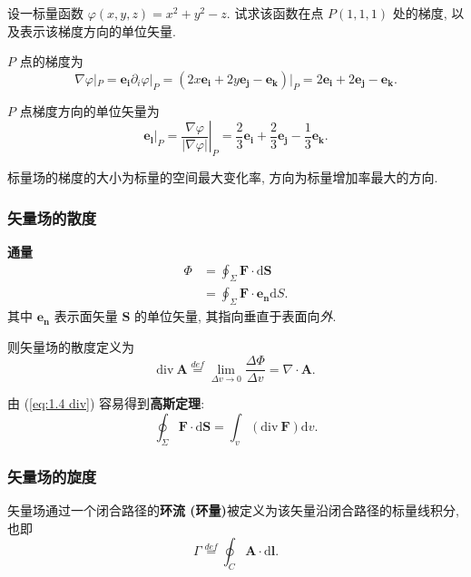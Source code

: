 \begin{exampleprob}
    设一标量函数 $\varphi(x,y,z)=x^2+y^2-z$. 试求该函数在点 $P(1,1,1)$ 处的梯度, 以及表示该梯度方向的单位矢量.

    \begin{solution}
        $P$ 点的梯度为
        \begin{equation*}
            \nabla\varphi|_P=\bm{e_i}\partial_i\varphi|_P=(2x\bm{e_i}+2y\bm{e_j}-\bm{e_k})|_P=2\bm{e_i}+2\bm{e_j}-\bm{e_k}.
        \end{equation*}

        $P$ 点梯度方向的单位矢量为
        \begin{equation*}
            \bm{e_l}|_P=\left.\frac{\nabla\varphi}{|\nabla\varphi|}\right|_P=\frac{2}{3}\bm{e_i}+\frac{2}{3}\bm{e_j}-\frac{1}{3}\bm{e_k}.
        \end{equation*}
    \end{solution}
\end{exampleprob}

标量场的梯度的大小为标量的空间最大变化率, 方向为标量增加率最大的方向.

\subsubsection{矢量场的散度}
\textbf{通量}
\begin{equation}
    \begin{aligned}
        \Phi & =\oint_{\Sigma}\bm{F}\cdot\mathrm{d}\bm{S}     \\
             & =\oint_{\Sigma}\bm{F}\cdot\bm{e_n}\mathrm{d}S.
    \end{aligned}
\end{equation}
其中 $\bm{e_n}$ 表示面矢量 $\bm{S}$ 的单位矢量, 其指向垂直于表面向\textit{外}.

则矢量场的散度定义为
\begin{equation} \label{eq:1.4 div}
    \mathrm{div}\ \bm{A}\stackrel{def}{=}\lim_{\Delta v\rightarrow 0}\frac{\Delta\Phi}{\Delta v}=\nabla\cdot\bm{A}.
\end{equation}

由 (\ref{eq:1.4 div}) 容易得到\textbf{高斯定理}:
\begin{equation}
    \oint_\Sigma\bm{F}\cdot\mathrm{d}\bm{S}=\int_{v}(\mathrm{div}\ \bm{F})\mathrm{d}v.
\end{equation}

\subsubsection{矢量场的旋度}
矢量场通过一个闭合路径的\textbf{环流 (环量)}被定义为该矢量沿闭合路径的标量线积分, 也即
\begin{equation}
    \Gamma\stackrel{def}{=}\oint_C\bm{A}\cdot\mathrm{d}\bm{l}.
\end{equation}

